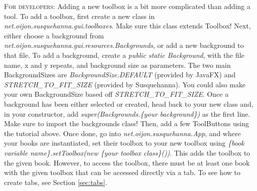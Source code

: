 \documentclass{report}
\begin{document}
	\begin{tcolorbox}[width=1\textwidth]
		\textsc{For developers:} Adding a new toolbox is a bit more complicated than adding a tool. To add a toolbox, first create a new class in \emph{net.oijon.susquehanna.gui.toolboxes}. Make sure this class extends Toolbox! Next, either choose a background from \emph{net.oijon.susquehanna.gui.resources.Backgrounds}, or add a new background to that file. To add a background, create a \emph{public static Background}, with the file name, x and y repeats, and background size as parameters. The two main BackgroundSizes are \emph{BackgroundSize.DEFAULT} (provided by JavaFX) and \emph{STRETCH\_TO\_FIT\_SIZE} (provided by Susquehanna). You could also make your own BackgroundSize based off \emph{STRETCH\_TO\_FIT\_SIZE}. Once a background has been either selected or created, head back to your new class and, in your constructor, add \emph{super(Backgrounds.\{your background\})} as the first line. Make sure to import the backgrounds class! Then, add a few ToolButtons using the tutorial above. Once done, go into \emph{net.oijon.susquehanna.App}, and where your books are instantiated, set their toolbox to your new toolbox using \emph{\{book variable name\}.setToolbox(new \{your toolbox class\}())}. This adds the toolbox to the given book. However, to access the toolbox, there must be at least one book with the given toolbox that can be accessed directly via a tab. To see how to create tabs, see Section \ref{sec:tabs}.
	\end{tcolorbox}
\end{document}
